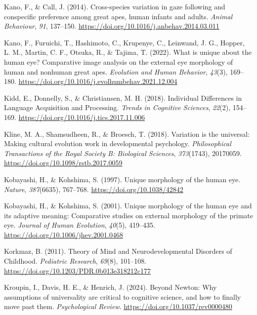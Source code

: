 \documentclass[
]{scrbook}
\newlength{\cslhangindent}
\newenvironment{CSLReferences}[2] %
 {\begin{list}{}{%
  \setlength{\itemindent}{0pt}
  \setlength{\leftmargin}{0pt}
  \setlength{\parsep}{0pt}
  \ifodd #1
   \setlength{\leftmargin}{\cslhangindent}
   \setlength{\itemindent}{-1\cslhangindent}
  \fi
  \setlength{\itemsep}{#2\baselineskip}}}
 {\end{list}}
\begin{document}
\begin{CSLReferences}{1}{0}
Kano, F., \& Call, J. (2014). Cross-species variation in gaze following and conspecific preference among great apes, human infants and adults. \emph{Animal Behaviour}, \emph{91}, 137--150. \url{https://doi.org/10.1016/j.anbehav.2014.03.011}

Kano, F., Furuichi, T., Hashimoto, C., Krupenye, C., Leinwand, J. G., Hopper, L. M., Martin, C. F., Otsuka, R., \& Tajima, T. (2022). What is unique about the human eye? {Comparative} image analysis on the external eye morphology of human and nonhuman great apes. \emph{Evolution and Human Behavior}, \emph{43}(3), 169--180. \url{https://doi.org/10.1016/j.evolhumbehav.2021.12.004}

Kidd, E., Donnelly, S., \& Christiansen, M. H. (2018). Individual {Differences} in {Language Acquisition} and {Processing}. \emph{Trends in Cognitive Sciences}, \emph{22}(2), 154--169. \url{https://doi.org/10.1016/j.tics.2017.11.006}

Kline, M. A., Shamsudheen, R., \& Broesch, T. (2018). Variation is the universal: Making cultural evolution work in developmental psychology. \emph{Philosophical Transactions of the Royal Society B: Biological Sciences}, \emph{373}(1743), 20170059. \url{https://doi.org/10.1098/rstb.2017.0059}

Kobayashi, H., \& Kohshima, S. (1997). Unique morphology of the human eye. \emph{Nature}, \emph{387}(6635), 767--768. \url{https://doi.org/10.1038/42842}

Kobayashi, H., \& Kohshima, S. (2001). Unique morphology of the human eye and its adaptive meaning: Comparative studies on external morphology of the primate eye. \emph{Journal of Human Evolution}, \emph{40}(5), 419--435. \url{https://doi.org/10.1006/jhev.2001.0468}

Korkmaz, B. (2011). Theory of {Mind} and {Neurodevelopmental Disorders} of {Childhood}. \emph{Pediatric Research}, \emph{69}(8), 101--108. \url{https://doi.org/10.1203/PDR.0b013e318212c177}

Kroupin, I., Davis, H. E., \& Henrich, J. (2024). Beyond {Newton}: {Why} assumptions of universality are critical to cognitive science, and how to finally move past them. \emph{Psychological Review}. \url{https://doi.org/10.1037/rev0000480}


\end{CSLReferences}
\end{document}
